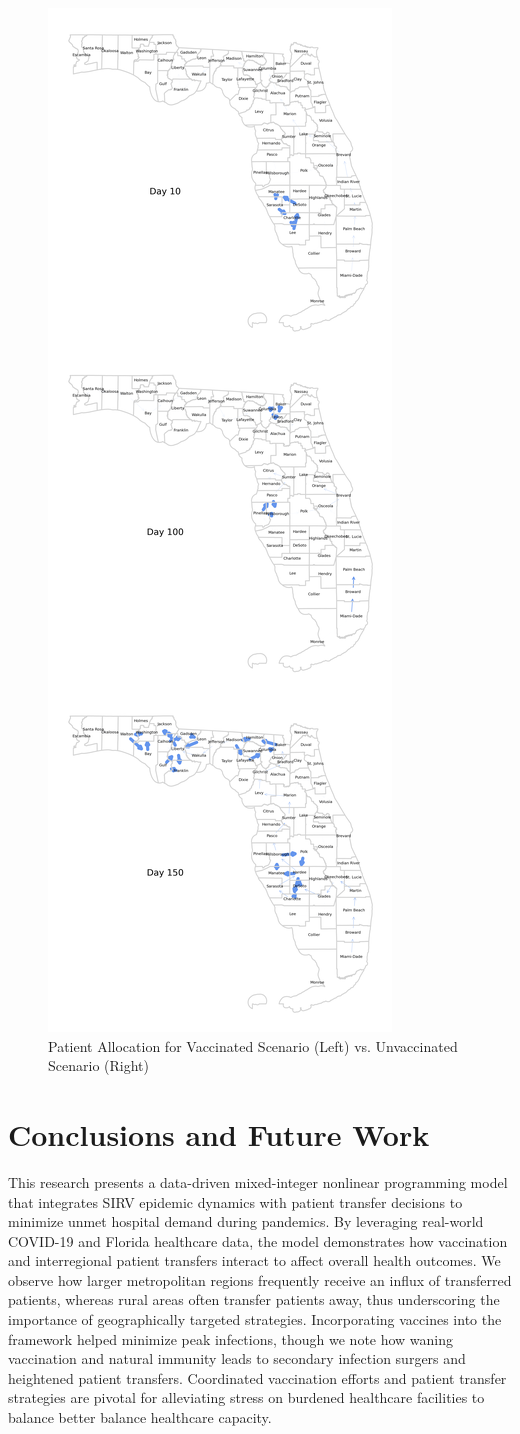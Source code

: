 \documentclass{article}
\begin{document}
\begin{figure}
    \includegraphics[width=0.43\linewidth]{pics/paperStackedPatientTransfersNoVax.png}
    \caption{Patient Allocation for Vaccinated Scenario (Left) vs. Unvaccinated Scenario (Right)}\label{fig:patientAlloc}
\end{figure}

\section{Conclusions and Future Work}
This research presents a data-driven mixed-integer nonlinear programming model that integrates SIRV epidemic dynamics with patient transfer decisions to minimize unmet hospital demand during pandemics. By leveraging real-world COVID-19 and Florida healthcare data, the model demonstrates how vaccination and interregional patient transfers interact to affect overall health outcomes. We observe how larger metropolitan regions frequently receive an influx of transferred patients, whereas rural areas often transfer patients away, thus underscoring the importance of geographically targeted strategies. Incorporating vaccines into the framework helped minimize peak infections, though we note how waning vaccination and natural immunity leads to secondary infection surgers and heightened patient transfers. Coordinated vaccination efforts and patient transfer strategies are pivotal for alleviating stress on burdened healthcare facilities to balance better balance healthcare capacity. 
\end{document}
